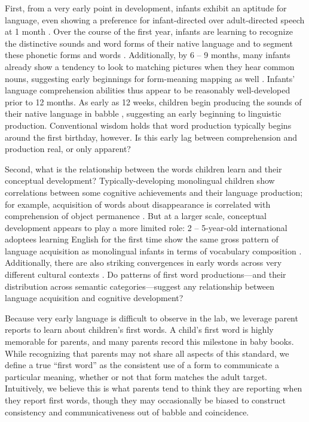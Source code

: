 \documentclass[10pt,letterpaper]{article}
\begin{document}
First, from a very early point in development, infants exhibit an aptitude for language, even showing a preference for infant-directed over adult-directed speech at 1 month \cite{cooper1990}. Over the course of the first year, infants are learning to recognize the distinctive sounds and word forms of their native language \cite{kuhl2004} and to segment these phonetic forms and words \cite{werker2005}. Additionally, by 6 -- 9 months, many infants already show a tendency to look to matching pictures when they hear common nouns, suggesting early beginnings for form-meaning mapping as well \cite{tincoff1999,tincoff2012,bergelson2012}. Infants' language comprehension abilities thus appear to be reasonably well-developed prior to 12 months. As early as 12 weeks, children begin producing the sounds of their native language in babble \cite{kuhl1996}, suggesting an early beginning to linguistic production. Conventional wisdom holds that word production typically begins around the first birthday, however. Is this early lag between comprehension and production real, or only apparent?

Second, what is the relationship between the words children learn and their conceptual development? Typically-developing monolingual children show correlations between some cognitive achievements and their language production; for example, acquisition of words about disappearance is correlated with comprehension of object permanence \cite{gopnik1986}. But at a larger scale, conceptual development appears to play a more limited role: 2 -- 5-year-old international adoptees learning English for the first time show the same gross pattern of language acquisition as monolingual infants in terms of vocabulary composition \cite{snedeker2007}. Additionally, there are also striking convergences in early words across very different cultural contexts \cite{tardif2007}. Do patterns of first word productions---and their distribution across semantic categories---suggest any relationship between language acquisition and cognitive development? 

Because very early language is difficult to observe in the lab, we leverage parent reports to learn about children's first words. A child's first word is highly memorable for parents, and many parents record this milestone in baby books. While recognizing that parents may not share all aspects of this standard, we define a true ``first word'' as the consistent use of a form to communicate a particular meaning, whether or not that form matches the adult target. Intuitively, we believe this is what parents tend to think they are reporting when they report first words, though they may occasionally be biased to construct consistency and communicativeness out of babble and coincidence.
\end{document}
